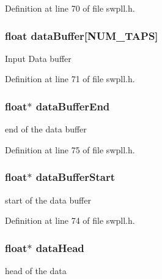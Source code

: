 Definition at line 70 of file swpll.\+h.

\hypertarget{structfir_inst_ac14aaae21e04566f810b07f12356391d}{
\subsubsection[{data\+Buffer}]{\setlength{\rightskip}{0pt plus 5cm}float data\+Buffer\mbox{[}N\+U\+M\+\_\+\+T\+A\+P\+S\mbox{]}}}\label{structfir_inst_ac14aaae21e04566f810b07f12356391d}
Input Data buffer 

Definition at line 71 of file swpll.\+h.

\hypertarget{structfir_inst_a37651cee0a39534fd328bea7a9544e64}{
\subsubsection[{data\+Buffer\+End}]{\setlength{\rightskip}{0pt plus 5cm}float$\ast$ data\+Buffer\+End}}\label{structfir_inst_a37651cee0a39534fd328bea7a9544e64}
end of the data buffer 

Definition at line 75 of file swpll.\+h.

\hypertarget{structfir_inst_a091a490fe2e1bfccc41e380571b805b4}{
\subsubsection[{data\+Buffer\+Start}]{\setlength{\rightskip}{0pt plus 5cm}float$\ast$ data\+Buffer\+Start}}\label{structfir_inst_a091a490fe2e1bfccc41e380571b805b4}
start of the data buffer 

Definition at line 74 of file swpll.\+h.

\hypertarget{structfir_inst_a36450131e3f9237482ea9759dc23117a}{
\subsubsection[{data\+Head}]{\setlength{\rightskip}{0pt plus 5cm}float$\ast$ data\+Head}}\label{structfir_inst_a36450131e3f9237482ea9759dc23117a}
head of the data 


